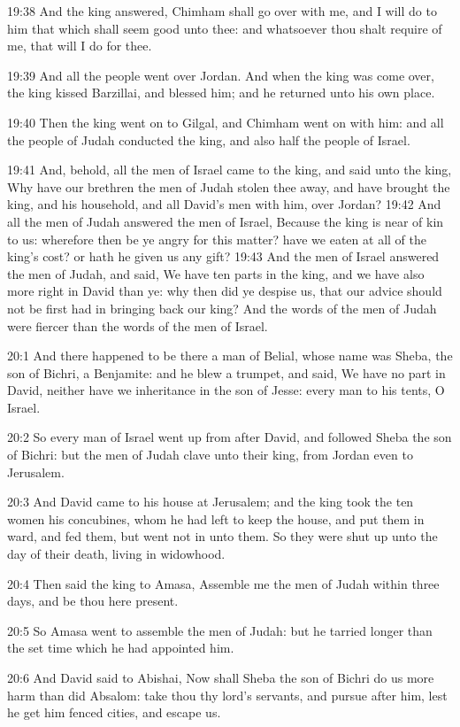 19:38 And the king answered, Chimham shall go over with me, and I will do to him that which shall seem good unto thee: and whatsoever thou shalt require of me, that will I do for thee.

19:39 And all the people went over Jordan. And when the king was come over, the king kissed Barzillai, and blessed him; and he returned unto his own place.

19:40 Then the king went on to Gilgal, and Chimham went on with him: and all the people of Judah conducted the king, and also half the people of Israel.

19:41 And, behold, all the men of Israel came to the king, and said unto the king, Why have our brethren the men of Judah stolen thee away, and have brought the king, and his household, and all David's men with him, over Jordan?  19:42 And all the men of Judah answered the men of Israel, Because the king is near of kin to us: wherefore then be ye angry for this matter? have we eaten at all of the king's cost? or hath he given us any gift?  19:43 And the men of Israel answered the men of Judah, and said, We have ten parts in the king, and we have also more right in David than ye: why then did ye despise us, that our advice should not be first had in bringing back our king?  And the words of the men of Judah were fiercer than the words of the men of Israel.

20:1 And there happened to be there a man of Belial, whose name was Sheba, the son of Bichri, a Benjamite: and he blew a trumpet, and said, We have no part in David, neither have we inheritance in the son of Jesse: every man to his tents, O Israel.

20:2 So every man of Israel went up from after David, and followed Sheba the son of Bichri: but the men of Judah clave unto their king, from Jordan even to Jerusalem.

20:3 And David came to his house at Jerusalem; and the king took the ten women his concubines, whom he had left to keep the house, and put them in ward, and fed them, but went not in unto them. So they were shut up unto the day of their death, living in widowhood.

20:4 Then said the king to Amasa, Assemble me the men of Judah within three days, and be thou here present.

20:5 So Amasa went to assemble the men of Judah: but he tarried longer than the set time which he had appointed him.

20:6 And David said to Abishai, Now shall Sheba the son of Bichri do us more harm than did Absalom: take thou thy lord's servants, and pursue after him, lest he get him fenced cities, and escape us.

